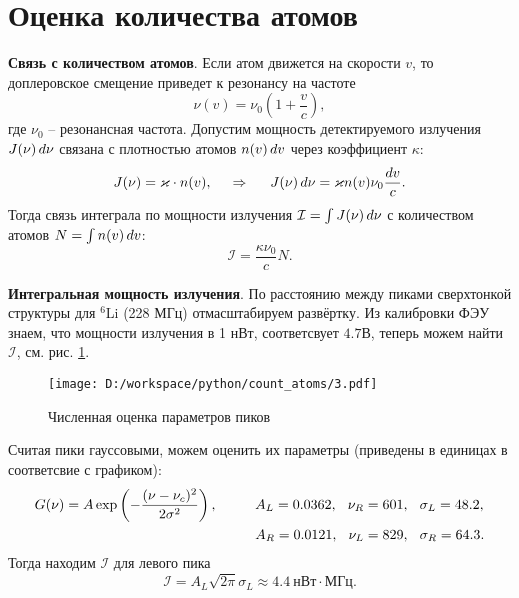 \section*{Оценка количества атомов}


\textbf{Связь с количеством атомов}. 
Если атом движется на скорости $v$, то доплеровское смещение приведет к резонансу на частоте
\begin{equation*}
	\nu(v) = \nu_0 \left(1 + \frac{v}{c}\right),
\end{equation*}
где $\nu_0$ -- резонансная частота.
Допустим мощность детектируемого излучения $J(\nu) \, d \nu$ связана с плотностью атомов $n(v) \, d v$ через коэффициент $\kappa$:
\begin{equation*}
	J(\nu) = \varkappa \cdot n(v),
	\hspace{0.5cm} \Rightarrow \hspace{0.5cm}
	J(\nu) \, d \nu = \varkappa n(v) \nu_0 \frac{dv}{c}.
\end{equation*}
Тогда связь интеграла по мощности излучения $\mathcal I = \int J(\nu) \, d \nu$ с количеством атомов $N = \int n(v) \, d v$:
\begin{equation*}
	\mathcal I = \frac{\kappa \nu_0}{c} N.
\end{equation*}

\textbf{Интегральная мощность излучения}. По расстоянию между пиками сверхтонкой структуры для ${}^6$Li (228 МГц) отмасштабируем развёртку. Из калибровки ФЭУ знаем, что мощности излучения в 1 нВт, соответсвует $4.7$В, теперь можем найти $\mathcal I$, см. рис. \ref{fig:1}.

\begin{figure}[h]
    \centering
    \texttt{[image: D:/workspace/python/count\_atoms/3.pdf]}
    \caption{Численная оценка параметров пиков}
    \label{fig:1}
\end{figure}



Считая пики гауссовыми, можем оценить их параметры (приведены в единицах в соответсвие с графиком):
\begin{align*}
	G(\nu) = A \exp\left(- \frac{(\nu-\nu_c)^2}{2 \sigma^2}\right),
	\hspace{10 mm} 
	&A_L = 0.0362,
	\hspace{2.5 mm} 
	\nu_R = 601, 
	\hspace{2.5 mm} 
	\sigma_L = 48.2, \\
	&A_R = 0.0121,
	\hspace{2.5 mm} 
	\nu_L = 829,
	\hspace{2.5 mm} 
	\sigma_R = 64.3.
\end{align*}
Тогда находим $\mathcal I$ для левого пика
\begin{equation*}
	\mathcal{I} = A_L \sqrt{2 \pi} \sigma_L \approx 4.4 \ \text{нВт}\cdot\text{МГц}.
\end{equation*}

